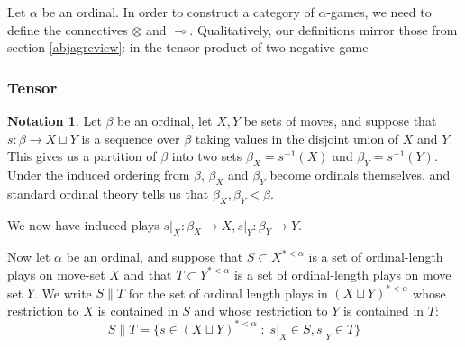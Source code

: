\documentclass[11pt]{article} %
\theoremstyle{plain} %
\theoremstyle{definition} %
\newtheorem{notation}[theorem]{Notation}
\theoremstyle{exercisestyle}
\newcommand*\from{\colon}
\newcommand{\cmap}[3]{#1\from{}#2\to{}#3}
\def \inv {^{-1}}
\newcommand{\tensor}{\otimes}
\renewcommand{\implies}{\multimap}
\newcommand{\cprd}{\sqcup}
\newcommand{\suchthat}{\;\colon\;}
\begin{document}
Let $\alpha$ be an ordinal.  In order to construct a category of $\alpha$-games, we need to define the connectives $\tensor$ and $\implies$.  Qualitatively, our definitions mirror those from section \ref{abjagreview}: in the tensor product of two negative game

\subsubsection{Tensor}

\begin{notation}
  Let $\beta$ be an ordinal, let $X,Y$ be sets of moves, and suppose that $\cmap{s}{\beta}{X\cprd Y}$ is a sequence over $\beta$ taking values in the disjoint union of $X$ and $Y$.  This gives us a partition of $\beta$ into two sets $\beta_X=s\inv(X)$ and $\beta_Y=s\inv(Y)$.  Under the induced ordering from $\beta$, $\beta_X$ and $\beta_Y$ become ordinals themselves, and standard ordinal theory tells us that $\beta_X,\beta_Y<\beta$.  

  We now have induced plays $\cmap{s\vert_X}{\beta_X}{X},\cmap{s\vert_Y}{\beta_Y}{Y}$.  

  Now let $\alpha$ be an ordinal, and suppose that $S\subset X^{*<\alpha}$ is a set of ordinal-length plays on move-set $X$ and that $T\subset Y^{*<\alpha}$ is a set of ordinal-length plays on move set $Y$.  We write $S\|T$ for the set of ordinal length plays in $(X\cprd Y)^{*<\alpha}$ whose restriction to $X$ is contained in $S$ and whose restriction to $Y$ is contained in $T$:
  \[
    S\|T=\{s\in(X\cprd Y)^{*<\alpha}\suchthat s\vert_X\in S, s\vert_Y\in T\}
  \]
\end{notation}
\end{document}
